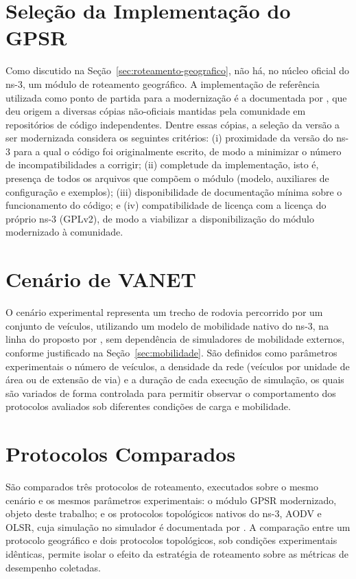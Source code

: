 \section{Seleção da Implementação do GPSR}
\label{sec:selecao-gpsr}

Como discutido na Seção~\ref{sec:roteamento-geografico}, não há, no núcleo oficial do ns-3,
um módulo de roteamento geográfico. A implementação de referência utilizada como ponto de
partida para a modernização é a documentada por , que
deu origem a diversas cópias não-oficiais mantidas pela comunidade em repositórios de código
independentes. Dentre essas cópias, a seleção da versão a ser modernizada considera os
seguintes critérios: (i) proximidade da versão do ns-3 para a qual o código foi originalmente
escrito, de modo a minimizar o número de incompatibilidades a corrigir; (ii) completude da
implementação, isto é, presença de todos os arquivos que compõem o módulo (modelo, auxiliares
de configuração e exemplos); (iii) disponibilidade de documentação mínima sobre o
funcionamento do código; e (iv) compatibilidade de licença com a licença do próprio ns-3
(GPLv2), de modo a viabilizar a disponibilização do módulo modernizado à comunidade.

\section{Cenário de VANET}
\label{sec:cenario-vanet}

O cenário experimental representa um trecho de rodovia percorrido por um conjunto de
veículos, utilizando um modelo de mobilidade nativo do ns-3, na linha do proposto por
, sem dependência de simuladores de mobilidade externos,
conforme justificado na Seção~\ref{sec:mobilidade}. São definidos como parâmetros
experimentais o número de veículos, a densidade da rede (veículos por unidade de área ou de
extensão de via) e a duração de cada execução de simulação, os quais são variados de forma
controlada para permitir observar o comportamento dos protocolos avaliados sob diferentes
condições de carga e mobilidade.

\section{Protocolos Comparados}
\label{sec:protocolos-comparados}

São comparados três protocolos de roteamento, executados sobre o mesmo cenário e os mesmos
parâmetros experimentais: o módulo GPSR modernizado, objeto deste trabalho; e os protocolos
topológicos nativos do ns-3, AODV e OLSR, cuja simulação no simulador é documentada por
. A comparação entre um protocolo geográfico e dois
protocolos topológicos, sob condições experimentais idênticas, permite isolar o efeito da
estratégia de roteamento sobre as métricas de desempenho coletadas.

